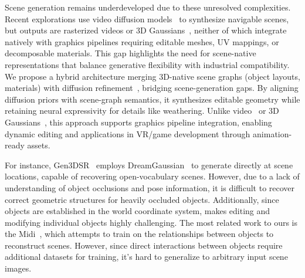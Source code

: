 Scene generation remains underdeveloped due to these unresolved complexities. Recent explorations use video diffusion models~\cite{Genesis} to synthesize navigable scenes, but outputs are rasterized videos or 3D Gaussians~\cite{tang2023dreamgaussian,tang2025lgm}, neither of which integrate natively with graphics pipelines requiring editable meshes, UV mappings, or decomposable materials. This gap highlights the need for scene-native representations that balance generative flexibility with industrial compatibility.
%
We propose a hybrid architecture merging 3D-native scene graphs (object layouts, materials) with diffusion refinement~\cite{poole2022dreamfusion,hong2023lrm}, bridging scene-generation gaps. By aligning diffusion priors with scene-graph semantics, it synthesizes editable geometry while retaining neural expressivity for details like weathering. Unlike video~\cite{Genesis} or 3D Gaussians~\cite{tang2023dreamgaussian,tang2025lgm}, this approach supports graphics pipeline integration, enabling dynamic editing and applications in VR/game development through animation-ready assets.



For instance, Gen3DSR~\cite{dogaru2024generalizable} employs DreamGaussian~\cite{tang2023dreamgaussian} to generate directly at scene locations, capable of recovering open-vocabulary scenes. 
However, due to a lack of understanding of object occlusions and pose information, it is difficult to recover correct geometric structures for heavily occluded objects. Additionally, since objects are established in the world coordinate system, makes editing and modifying individual objects highly challenging.
%
The most related work to ours is the Midi~\cite{huang2024midi}, which attempts to train on the relationships between objects to reconstruct scenes. However, since direct interactions between objects require additional datasets for training, it's hard to generalize to arbitrary input scene images.

